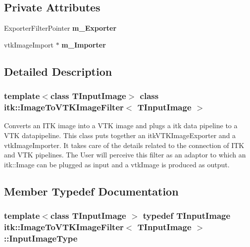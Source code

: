 \subsection*{Private Attributes}
\begin{DoxyCompactItemize}
\item 
\hypertarget{classitk_1_1_image_to_v_t_k_image_filter_ad00d5fde8d41cff1c67157a4db345d9d}{
ExporterFilterPointer {\bfseries m\_\-Exporter}}
\label{classitk_1_1_image_to_v_t_k_image_filter_ad00d5fde8d41cff1c67157a4db345d9d}

\item 
\hypertarget{classitk_1_1_image_to_v_t_k_image_filter_a767ad68d2686e62cee454d3776d6efe8}{
vtkImageImport $\ast$ {\bfseries m\_\-Importer}}
\label{classitk_1_1_image_to_v_t_k_image_filter_a767ad68d2686e62cee454d3776d6efe8}

\end{DoxyCompactItemize}


\subsection{Detailed Description}
\subsubsection*{template$<$class TInputImage$>$ class itk::ImageToVTKImageFilter$<$ TInputImage $>$}

Converts an ITK image into a VTK image and plugs a itk data pipeline to a VTK datapipeline. This class puts together an itkVTKImageExporter and a vtkImageImporter. It takes care of the details related to the connection of ITK and VTK pipelines. The User will perceive this filter as an adaptor to which an itk::Image can be plugged as input and a vtkImage is produced as output. 

\subsection{Member Typedef Documentation}
\hypertarget{classitk_1_1_image_to_v_t_k_image_filter_a4676ef1161730b61cddaf6ac892662f3}{
\subsubsection[{InputImageType}]{\setlength{\rightskip}{0pt plus 5cm}template$<$class TInputImage $>$ typedef TInputImage {\bf itk::ImageToVTKImageFilter}$<$ TInputImage $>$::{\bf InputImageType}}}
\label{classitk_1_1_image_to_v_t_k_image_filter_a4676ef1161730b61cddaf6ac892662f3}


